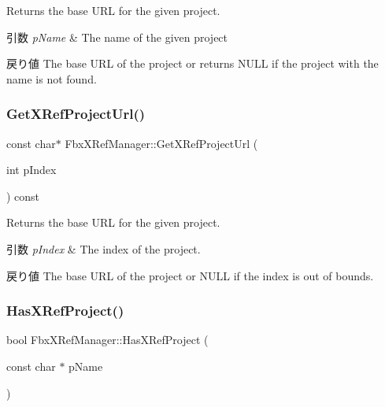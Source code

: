 Returns the base U\+RL for the given project. 
\begin{DoxyParams}{引数}
{\em p\+Name} & The name of the given project \\
\hline
\end{DoxyParams}
\begin{DoxyReturn}{戻り値}
The base U\+RL of the project or returns N\+U\+LL if the project with the name is not found. 
\end{DoxyReturn}
\mbox{\label{class_fbx_x_ref_manager_ab8f651bb9163d1c7ba56586c0c879c07}} 
\subsubsection{\texorpdfstring{Get\+X\+Ref\+Project\+Url()}{GetXRefProjectUrl()}\hspace{0.1cm}{\footnotesize\ttfamily [3/3]}}
{\footnotesize\ttfamily const char$\ast$ Fbx\+X\+Ref\+Manager\+::\+Get\+X\+Ref\+Project\+Url (\begin{DoxyParamCaption}\item[{int}]{p\+Index }\end{DoxyParamCaption}) const}

Returns the base U\+RL for the given project. 
\begin{DoxyParams}{引数}
{\em p\+Index} & The index of the project. \\
\hline
\end{DoxyParams}
\begin{DoxyReturn}{戻り値}
The base U\+RL of the project or N\+U\+LL if the index is out of bounds. 
\end{DoxyReturn}
\mbox{\label{class_fbx_x_ref_manager_afa24aa1ef0d54bf0288947f9e005ec7c}} 
\subsubsection{\texorpdfstring{Has\+X\+Ref\+Project()}{HasXRefProject()}}
{\footnotesize\ttfamily bool Fbx\+X\+Ref\+Manager\+::\+Has\+X\+Ref\+Project (\begin{DoxyParamCaption}\item[{const char $\ast$}]{p\+Name }\end{DoxyParamCaption})\hspace{0.3cm}{\ttfamily [inline]}}

